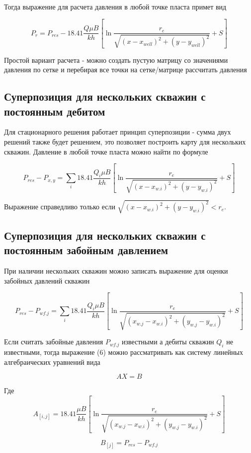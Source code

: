 \documentclass[oneside, openany]{memoir}
\begin{document}
	Тогда выражение для расчета давления в любой точке пласта примет вид
	
	\begin{equation}
		P_{r} = P_{res} - 18.41\dfrac{ Q\mu B }{kh} \left[ \ln\dfrac{r_e}{\sqrt{ (x-x_{well})^2 + (y-y_{well})^2 }} +S \right]
	\end{equation}
	
	Простой вариант расчета  - можно создать пустую матрицу со значениями давления по сетке и перебирая все точки на сетке/матрице рассчитать давления
	
	\subsection{Суперпозиция для нескольких скважин с постоянным дебитом} 
	
	Для стационарного решения работает принцип суперпозиции - сумма двух решений также будет решением, это позволяет построить карту для нескольких скважин.
	Давление в любой точке пласта можно найти по формуле
	
	\begin{equation}
	P_{res} - P_{x,y} =  \sum_{i} 18.41\dfrac{ Q_i\mu B }{kh} \left[ \ln\frac{r_e}{\sqrt{ (x-x_{w.i})^2 + (y-y_{w.i})^2 }} +S \right]
	\end{equation}
	
	Выражение справедливо только если $\sqrt{ (x-x_{w.i})^2 + (y-y_{w.i})^2 }< r_e$.
	
	\subsection{Суперпозиция для нескольких скважин с постоянным забойным давлением}
	
	При наличии нескольких скважин можно записать выражение для оценки забойных давлений скважин
	
	
	$$
	P_{res} - P_{wf.j} =  \sum_{i} 18.41\dfrac{ Q_i\mu B }{kh} \left[ \ln\dfrac{r_e}{\sqrt{ (x_{w.j}-x_{w.i})^2 + (y_{w.j}-y_{w.i})^2 }} +S \right]
	$$
	
	Если считать забойные давления $P_{wf.j}$ известными а дебиты скважин $Q_i$ не известными, тогда выражение (6) можно рассматривать как систему линейных алгебраических уравнений вида
	
	$$AX = B$$
	
	Где
	$$
	A_{[i,j]} = 18.41\dfrac{ \mu B }{kh} \left[ \ln\dfrac{r_e}{\sqrt{ (x_{w.j}-x_{w.i})^2 + (y_{w.j}-y_{w.i})^2 }} +S \right]
	$$
	
	$$
	B_{[j]}=P_{res} - P_{wf.j}
	$$
	
\end{document}
